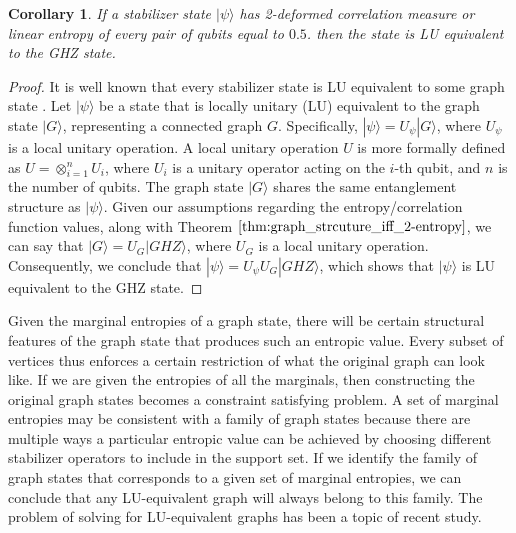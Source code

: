 \documentclass{article}
\newtheorem{corollary}[theorem]{Corollary}
\newcommand{\ket}[1]{|#1\rangle}
\begin{document}
\begin{corollary}
    If a stabilizer state $\ket{\psi}$ has 2-deformed correlation measure or linear entropy of every pair of qubits equal to $0.5$. then the state is LU equivalent to the GHZ state.
\end{corollary}
\begin{proof}
    It is well known that every stabilizer state is LU equivalent to some graph state \cite{Walter_multipartite_entanglement}. Let $\ket{\psi}$ be a state that is locally unitary (LU) equivalent to the graph state $\ket{G}$, representing a connected graph $G$. Specifically, $\ket{\psi} = U_{\psi} \ket{G}$, where $U_{\psi}$ is a local unitary operation. A local unitary operation $U$ is more formally defined as $U = \otimes_{i=1}^{n} U_i$, where $U_i$ is a unitary operator acting on the $i$-th qubit, and $n$ is the number of qubits. The graph state $\ket{G}$ shares the same entanglement structure as $\ket{\psi}$. Given our assumptions regarding the entropy/correlation function values, along with Theorem $\ref{thm:graph_strcuture_iff_2-entropy}$, we can say that $\ket{G} = U_G \ket{GHZ}$, where $U_G$ is a local unitary operation. Consequently, we conclude that $\ket{\psi} = U_{\psi} U_G \ket{GHZ}$, which shows that $\ket{\psi}$ is LU equivalent to the GHZ state.
\end{proof}

 
 Given the marginal entropies of a graph state, there will be certain structural features of the graph state that produces such an entropic value. Every subset of vertices thus enforces a certain restriction of what the original graph can look like. If we are given the entropies of all the marginals, then constructing the original graph states becomes a constraint satisfying problem. A set of marginal entropies may be consistent with a family of graph states because there are multiple ways a particular entropic value can be achieved by choosing different stabilizer operators to include in the support set. If we identify the family of graph states that corresponds to a given set of marginal entropies, we can conclude that any LU-equivalent graph will always belong to this family. The problem of solving for LU-equivalent graphs has been a topic of recent study.

\end{document}
